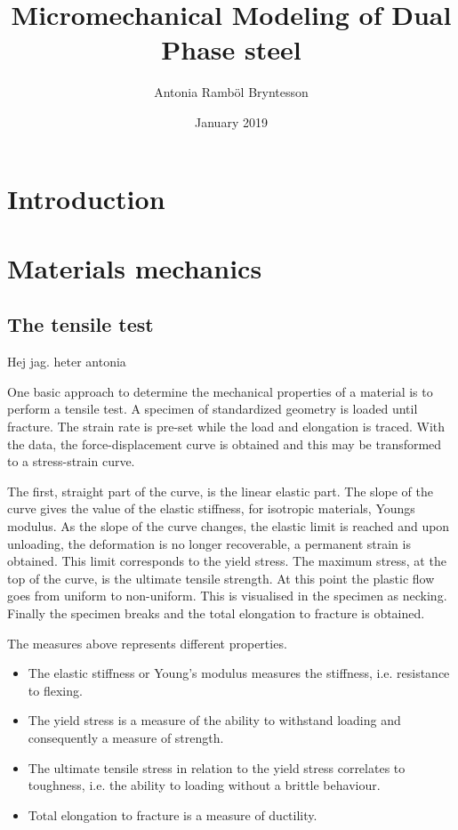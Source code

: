 \documentclass{article}
\title{Micromechanical Modeling of Dual Phase steel}
\author{Antonia Ramböl Bryntesson}
\date{January 2019}
\begin{document}
\maketitle
\tableofcontents
\section{Introduction}
\section{Materials mechanics}
\subsection{The tensile test}
\label{Section:Tensiletest}

Hej jag. heter antonia

One basic approach to determine the mechanical properties of a material is to perform a tensile test. A specimen of standardized geometry is loaded until fracture. The strain rate is pre-set while the load and elongation is traced. With the data, the force-displacement curve is obtained and this may be transformed to a stress-strain curve.

The first, straight part of the curve, is the linear elastic part. The slope of the curve gives the value of the elastic stiffness, for isotropic materials, Youngs modulus. As the slope of the curve changes, the elastic limit is reached and upon unloading, the deformation is no longer recoverable, a permanent strain is obtained. This limit corresponds to the yield stress. The maximum stress, at the top of the curve, is the ultimate tensile strength. At this point the plastic flow goes from uniform to non-uniform. This is visualised in the specimen as necking. Finally the specimen breaks and the total elongation to fracture is obtained.

The measures above represents different properties.
\begin{itemize}
    \item The elastic stiffness or Young's modulus measures the stiffness, i.e. resistance to flexing.
    \item The yield stress is a measure of the ability to withstand loading and consequently a measure of strength. 
    \item The ultimate tensile stress in relation to the yield stress correlates to toughness, i.e. the ability to loading without a brittle behaviour.
    \item Total elongation to fracture is a measure of ductility.
\end{itemize}
\end{document}
